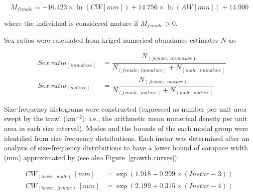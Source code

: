 \documentclass[11pt]{article}
\begin{document}
\begin{equation}
  M_{female} = -16.423 \times \ln(CW [mm]) + 14.756 \times \ln(AW[mm]) + 14.900
\end{equation}

where the individual is considered mature if $M_{female} > 0 $.

Sex ratios were calculated from kriged numerical abundance estimates $N$ as:


\begin{eqnarray}
  & Sex\:ratio_{(immature)} & = \dfrac{ N_{(female,\: immature)} }{N_{(female,\: immature)} + N_{(male, \: immature)}} \\
  & Sex\:ratio_{(mature)} & = \dfrac{ N_{(female,\: mature)} }{N_{(female,\: mature)} + N_{ (male,\: mature) }} 
\end{eqnarray}


Size-frequency histograms were constructed (expressed as number per unit area swept by the trawl (km$^{-2}$); i.e., the arithmetic mean numerical density per unit area in each size interval). Modes and the bounds of the each modal group were identified from size frequency distributions. Each instar was determined after an analysis of size-frequency distributions to have a lower bound of carapace width (mm) approximated by (see also Figure~\ref{growth.curves}):

\begin{eqnarray}
  CW_{(lower, \: male)}\:[mm]   & = \exp(1.918 + 0.299 \times (Instar - 3) ) \\ 
  CW_{(lower, \: female)}\:[mm] & = \exp(2.199 + 0.315 \times (Instar - 4) )
\end{eqnarray}



\end{document}

